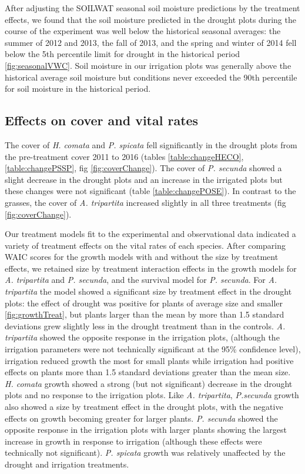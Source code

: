 \documentclass[11pt]{article}
\begin{document}
\begin{doublespacing}
After adjusting the SOILWAT seasonal soil moisture predictions by the treatment effects, we found that the soil moisture predicted in the drought plots during the course of the experiment was well below the historical seasonal averages: the summer of 2012 and 2013, the fall of 2013, and the spring and winter of 2014 fell below the 5th percentile limit for drought in the historical period \ref{fig:seasonalVWC}. Soil moisture in our irrigation plots was generally above the historical average soil moisture but conditions never exceeded the 90th percentile for soil moisture in the historical period. 

\subsection*{Effects on cover and vital rates}

The cover of \textit{H. comata} and \textit{P. spicata} fell significantly in the drought plots from the pre-treatment cover 2011 to 2016 (tables \ref{table:changeHECO}, \ref{table:changePSSP}, fig \ref{fig:coverChange}). The cover of \textit{P. secunda} showed a slight decrease in the drought plots and an increase in the irrigated plots but these changes were not significant (table \ref{table:changePOSE}).  In contrast to the grasses, the cover of \textit{A. tripartita} increased slightly in all three treatments (fig \ref{fig:coverChange}). 

Our treatment models fit to the experimental and observational data indicated a variety of treatment effects on the vital rates of each species. After comparing WAIC scores for the growth models with and without the size by treatment effects, we retained size by treatment interaction effects in the growth models for \textit{A. tripartita} and \textit{P. secunda}, and the survival model for \textit{P. secunda}. For \textit{A. tripartita} the model showed a significant size by treatment effect in the drought plots: the effect of drought was positive for plants of average size and smaller \ref{fig:growthTreat}, but plants larger than the mean by more than 1.5 standard deviations grew slightly less in the drought treatment than in the controls. \textit{A. tripartita} showed the opposite response in the irrigation plots, (although the irrigation parameters were not technically significant at the 95\% confidence level), irrigation reduced growth the most for small plants while irrigation had positive effects on plants more than 1.5 standard deviations greater than the mean size. \textit{H. comata} growth showed a strong (but not significant) decrease in the drought plots and no response to the irrigation plots.  Like \textit{A. tripartita}, \textit{P.secunda} growth also showed a size by treatment effect in the drought plots, with the negative effects on growth becoming greater for larger plants. \textit{P. secunda} showed the opposite response in the irrigation plots with larger plants showing the largest increase in growth in response to irrigation (although these effects were technically not significant). \textit{P. spicata} growth was relatively unaffected by the drought and irrigation treatments. 


\end{doublespacing}
\end{document}
